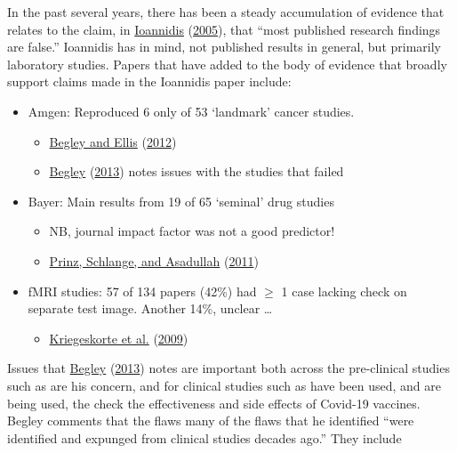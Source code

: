 \documentclass[
  10pt,
  b5paper]{book}
\providecommand{\tightlist}{%
  \setlength{\itemsep}{0pt}\setlength{\parskip}{0pt}}
\begin{document}
In the past several years, there has been a steady accumulation
of evidence that relates to the claim, in \protect\hyperlink{ref-r19_ioannidis_2005}{Ioannidis} (\protect\hyperlink{ref-r19_ioannidis_2005}{2005}),
that ``most published research findings are false.'' Ioannidis
has in mind, not published results in general, but primarily
laboratory studies. Papers that have added to the
body of evidence that broadly support claims made in the
Ioannidis paper include:

\begin{itemize}
\tightlist
\item
  Amgen: Reproduced 6 only of 53 `landmark' cancer studies.

  \begin{itemize}
  \tightlist
  \item
    \protect\hyperlink{ref-r23_begley_ellis_2012}{Begley and Ellis} (\protect\hyperlink{ref-r23_begley_ellis_2012}{2012})
  \item
    \protect\hyperlink{ref-r2_begley_2013}{Begley} (\protect\hyperlink{ref-r2_begley_2013}{2013}) notes issues with the studies that failed
  \end{itemize}
\item
  Bayer: Main results from 19 of 65 `seminal' drug studies

  \begin{itemize}
  \tightlist
  \item
    NB, journal impact factor was not a good predictor!
  \item
    \protect\hyperlink{ref-r9_prinz_schlange_asadullah_2011}{Prinz, Schlange, and Asadullah} (\protect\hyperlink{ref-r9_prinz_schlange_asadullah_2011}{2011})
  \end{itemize}
\item
  fMRI studies: 57 of 134 papers (42\%) had \(\geq\) 1 case lacking
  check on separate test image.
  Another 14\%, unclear \ldots{}

  \begin{itemize}
  \tightlist
  \item
    \protect\hyperlink{ref-r8_kriegeskorte_simmons_bellgowan_baker_2009}{Kriegeskorte et al.} (\protect\hyperlink{ref-r8_kriegeskorte_simmons_bellgowan_baker_2009}{2009})
  \end{itemize}
\end{itemize}

Issues that \protect\hyperlink{ref-r2_begley_2013}{Begley} (\protect\hyperlink{ref-r2_begley_2013}{2013}) notes are important both across
the pre-clinical studies such as are his concern, and for
clinical studies such as have been used, and are being used,
the check the effectiveness and side effects of Covid-19
vaccines. Begley comments that the flaws many of the
flaws that he identified ``were identified and expunged from
clinical studies decades ago.'' They include
\end{document}
